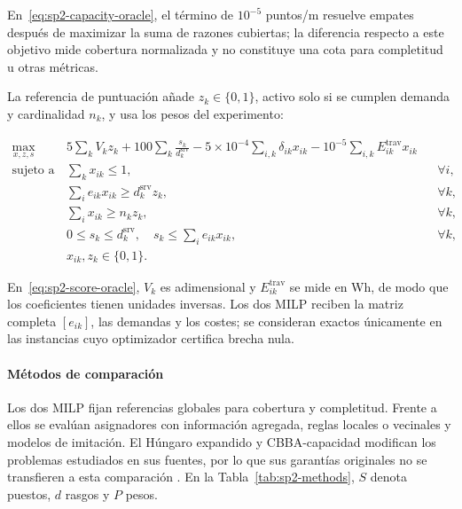 En~\eqref{eq:sp2-capacity-oracle}, el término de $10^{-5}$ puntos/m resuelve empates después de maximizar la suma de razones cubiertas; la diferencia respecto a este objetivo mide cobertura normalizada y no constituye una cota para completitud u otras métricas.

La referencia de puntuación añade $z_k\in\{0, 1\}$, activo solo si se cumplen demanda y cardinalidad $n_k$, y usa los pesos del experimento:

\begin{equation}
\label{eq:sp2-score-oracle}
\begin{aligned}
  \max_{x,z,s}\quad
  & 5\sum_k V_kz_k
    +100\sum_k\frac{s_k}{d_k^{\mathrm{srv}}}
    -5\times10^{-4}\sum_{i,k}\delta_{ik}x_{ik}
    -10^{-5}\sum_{i,k}E_{ik}^{\mathrm{trav}}x_{ik} \\
  \text{sujeto a}\quad
  & \sum_kx_{ik}\leq1, && \forall i,\\
  & \sum_i e_{ik}x_{ik}\geq d_k^{\mathrm{srv}}z_k, && \forall k,\\
  & \sum_i x_{ik}\geq n_kz_k, && \forall k,\\
  & 0\leq s_k\leq d_k^{\mathrm{srv}},\quad s_k\leq\sum_i e_{ik}x_{ik}, && \forall k,\\
  & x_{ik},z_k\in\{0, 1\}. &&
\end{aligned}
\end{equation}

En~\eqref{eq:sp2-score-oracle}, $V_k$ es adimensional y $E_{ik}^{\mathrm{trav}}$ se mide en Wh, de modo que los coeficientes tienen unidades inversas. Los dos MILP reciben la matriz completa $[e_{ik}]$, las demandas y los costes; se consideran exactos únicamente en las instancias cuyo optimizador certifica brecha nula.

\paragraph{Métodos de comparación}

Los dos MILP fijan referencias globales para cobertura y completitud. Frente a ellos se evalúan asignadores con información agregada, reglas locales o vecinales y modelos de imitación. El Húngaro expandido y CBBA-capacidad modifican los problemas estudiados en sus fuentes, por lo que sus garantías originales no se transfieren a esta comparación \parencite{kuhn1955Hungarian,choiBrunetHow2009CBBA}. En la Tabla~\ref{tab:sp2-methods}, $S$ denota puestos, $d$ rasgos y $P$ pesos.

